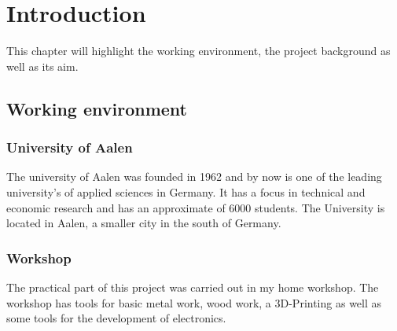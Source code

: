 \chapter{Introduction}
\label{introductio}

This chapter will highlight the working environment, the project background as well as its aim.

\section{Working environment}

\subsection{University of Aalen}
The university of Aalen was founded in 1962 and by now is one of the leading university's of applied sciences in Germany. It has a focus in technical and economic research and has an approximate of 6000 students. 
The University is located in Aalen, a smaller city in the south of Germany. 

\subsection{Workshop}
The practical part of this project was carried out in my home workshop. The workshop has tools for basic metal work, wood work, a 3D-Printing as well as some tools for the development of electronics.


